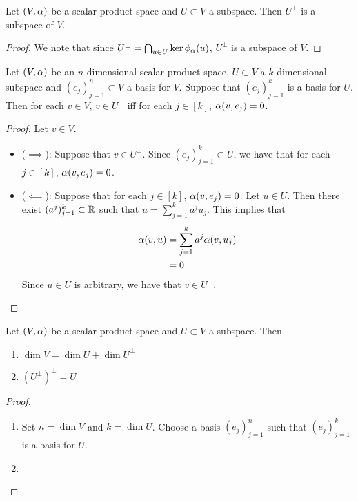 \documentclass{book}
\begin{document}
	\begin{ex}
		Let $(V, \alpha)$ be a scalar product space and $U \subset V$ a subspace. Then
		$U^{\perp}$ is a subspace of $V$.
	\end{ex}

	\begin{proof}
		We note that since $U^{\perp} = \bigcap_{u \in U} \ker \phi_{\alpha}(u)$, $U^{\perp}$ is a subspace of $V$.
	\end{proof}

	\begin{ex}
		Let $(V, \alpha)$ be an $n$-dimensional scalar product space, $U \subset V$ a $k$-dimensional subspace and $(e_j)_{j=1}^n \subset V$ a basis for $V$. Suppose that $(e_j)_{j=1}^k$ is a basis for $U$. Then for each $v \in V$, $v \in U^{\perp}$ iff for each $j \in [k]$, $\alpha(v, e_j) = 0$. 
	\end{ex}

	\begin{proof} Let $v \in V$.
		\begin{itemize}
			\item ($\implies$): Suppose that $v \in U^{\perp}$. Since $(e_j)_{j=1}^k \subset U$, we have that for each $j \in [k]$, $\alpha(v, e_j) = 0$. 
			\item ($\impliedby$): Suppose that for each $j \in [k]$, $\alpha(v, e_j) = 0$. Let $u \in U$. Then there exist $(a^j)_{j=1}^k \subset \mathbb{R}$ such that $u = \sum\limits_{j=1}^k a^j u_j$. This implies that 
			\begin{align*}
				\alpha(v, u) 
				& = \sum_{j=1}^k a^j \alpha (v, u_j) \\
				& = 0
			\end{align*}
			Since $u \in U$ is arbitrary, we have that $v \in U^{\perp}$. 
		\end{itemize}
	\end{proof}

	\begin{ex}
		Let $(V, \alpha)$ be a scalar product space and $U \subset V$ a subspace. Then
		\begin{enumerate}
			\item $\dim V = \dim U + \dim U^{\perp}$
			\item $(U^{\perp})^{\perp} = U$
		\end{enumerate}
	\end{ex}

	\begin{proof}\
		\begin{enumerate}
			\item Set $n = \dim V$ and $k = \dim U$. Choose a basis $(e_j)_{j=1}^n$ such that $(e_j)_{j=1}^k$ is a basis for $U$. 
			\item 
		\end{enumerate}
	\end{proof}	
	
\end{document}
